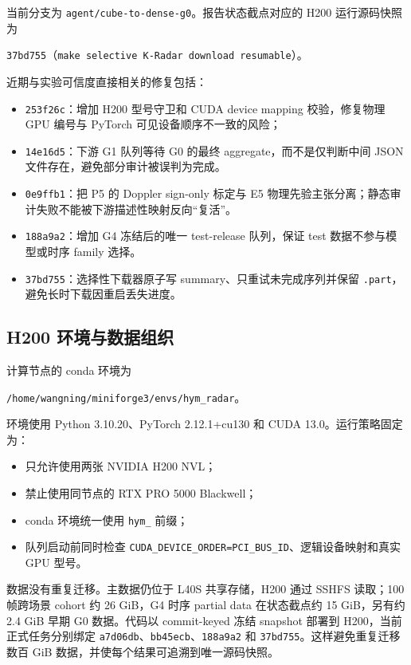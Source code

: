 \documentclass[11pt,a4paper,fontset=none]{ctexart}
\newcommand{\code}[1]{\texttt{#1}}
\begin{document}
当前分支为 \code{agent/cube-to-dense-g0}。报告状态截点对应的 H200 运行源码快照为
\begin{center}
\code{37bd755}（\texttt{make selective K-Radar download resumable}）。
\end{center}
近期与实验可信度直接相关的修复包括：
\begin{itemize}
  \item \code{253f26c}：增加 H200 型号守卫和 CUDA device mapping 校验，修复物理 GPU 编号与 PyTorch 可见设备顺序不一致的风险；
  \item \code{14e16d5}：下游 G1 队列等待 G0 的最终 aggregate，而不是仅判断中间 JSON 文件存在，避免部分审计被误判为完成。
  \item \code{0e9ffb1}：把 P5 的 Doppler sign-only 标定与 E5 物理先验主张分离；静态审计失败不能被下游描述性映射反向“复活”。
  \item \code{188a9a2}：增加 G4 冻结后的唯一 test-release 队列，保证 test 数据不参与模型或时序 family 选择。
  \item \code{37bd755}：选择性下载器原子写 summary、只重试未完成序列并保留 \code{.part}，避免长时下载因重启丢失进度。
\end{itemize}

\subsection{H200 环境与数据组织}

计算节点的 conda 环境为
\begin{center}
\code{/home/wangning/miniforge3/envs/hym\_radar}。
\end{center}
环境使用 Python 3.10.20、PyTorch 2.12.1+cu130 和 CUDA 13.0。运行策略固定为：
\begin{itemize}
  \item 只允许使用两张 NVIDIA H200 NVL；
  \item 禁止使用同节点的 RTX PRO 5000 Blackwell；
  \item conda 环境统一使用 \code{hym\_} 前缀；
  \item 队列启动前同时检查 \code{CUDA\_DEVICE\_ORDER=PCI\_BUS\_ID}、逻辑设备映射和真实 GPU 型号。
\end{itemize}

数据没有重复迁移。主数据仍位于 L40S 共享存储，H200 通过 SSHFS 读取；100 帧跨场景 cohort 约 26 GiB，G4 时序 partial data 在状态截点约 15 GiB，另有约 2.4 GiB 早期 G0 数据。代码以 commit-keyed 冻结 snapshot 部署到 H200，当前正式任务分别绑定 \code{a7d06db}、\code{bb45ecb}、\code{188a9a2} 和 \code{37bd755}。这样避免重复迁移数百 GiB 数据，并使每个结果可追溯到唯一源码快照。
\end{document}
